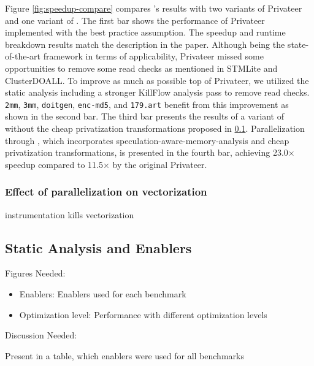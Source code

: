 Figure \ref{fig:speedup-compare} compares \namensp's results with two
variants of Privateer and one variant of \namensp. The first bar shows the
performance of Privateer implemented with the best practice assumption. The
speedup and runtime breakdown results match the description in the paper.
Although being the state-of-the-art framework in terms of applicability,
Privateer missed some opportunities to remove some read checks as mentioned
in STMLite\cite{mehrara:09:stmlite} and ClusterDOALL\cite{kim:12:cgo}. To
improve as much as possible top of Privateer, we utilized the static
analysis including a stronger KillFlow analysis pass to remove read checks.
\texttt{2mm}, \texttt{3mm}, \texttt{doitgen}, \texttt{enc-md5}, and
\texttt{179.art} benefit from this improvement as shown in the second bar.
The third bar presents the results of a variant of \name without the cheap
privatization transformations proposed in \ref{}. Parallelization through
\name, which incorporates speculation-aware-memory-analysis and cheap
privatization transformations, is presented in the fourth bar, achieving
23.0$\times$ speedup compared to 11.5$\times$ by the original Privateer.


\subsubsection{Effect of parallelization on vectorization}

instrumentation kills vectorization


\subsection{Static Analysis and Enablers}
Figures Needed:
\begin{itemize}

\item Enablers: Enablers used for each benchmark
\item Optimization level: Performance with different optimization levels
\end{itemize}

Discussion Needed:

Present in a table, which enablers were used for all benchmarks

